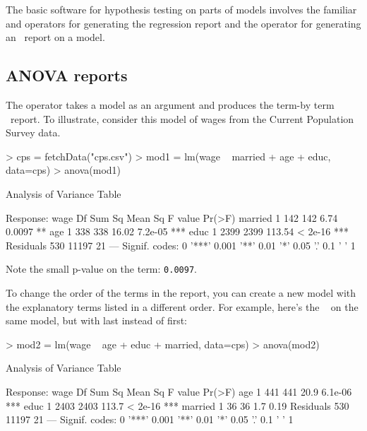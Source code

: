 



The basic software for hypothesis testing on parts of models involves the 
familiar  and  operators for generating the
regression report and the  operator for generating an
\ANOVA\ report on a model.

\subsection{ANOVA reports}



The  operator takes a model as an argument and produces
the term-by term \ANOVA\ report.  To illustrate, consider this model
of wages from the Current Population Survey data. \datasetCPS
\begin{Schunk}
\begin{Sinput}
> cps = fetchData("cps.csv")
> mod1 = lm(wage ~ married + age + educ, data=cps)
> anova(mod1)
\end{Sinput}
\begin{Soutput}
Analysis of Variance Table

Response: wage
           Df Sum Sq Mean Sq F value  Pr(>F)    
married     1    142     142    6.74  0.0097 ** 
age         1    338     338   16.02 7.2e-05 ***
educ        1   2399    2399  113.54 < 2e-16 ***
Residuals 530  11197      21                    
---
Signif. codes:  0 '***' 0.001 '**' 0.01 '*' 0.05 '.' 0.1 ' ' 1 
\end{Soutput}
\end{Schunk}

Note the small p-value on the  term: \texttt{0.0097}.

To change the order of the terms in the report, you can create a new
model with the explanatory terms listed in a different order.  For
example, here's the \ANOVA~ on the same model, but with 
last instead of first:
\begin{Schunk}
\begin{Sinput}
> mod2 = lm(wage ~ age + educ + married, data=cps)
> anova(mod2)
\end{Sinput}
\begin{Soutput}
Analysis of Variance Table

Response: wage
           Df Sum Sq Mean Sq F value  Pr(>F)    
age         1    441     441    20.9 6.1e-06 ***
educ        1   2403    2403   113.7 < 2e-16 ***
married     1     36      36     1.7    0.19    
Residuals 530  11197      21                    
---
Signif. codes:  0 '***' 0.001 '**' 0.01 '*' 0.05 '.' 0.1 ' ' 1 
\end{Soutput}
\end{Schunk}


